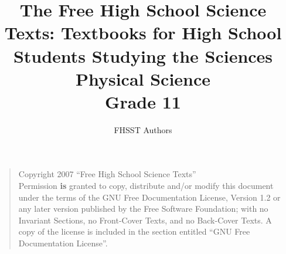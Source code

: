 \documentclass[9pt,a4paper,titlepage,twoside,openright]{extbook}
\begin{document}
\title{The Free High School Science Texts: Textbooks for High School Students Studying the Sciences\\
\textbf{Physical Science}\\
Grade 11}
\author{FHSST Authors}
\maketitle
\begin{quote}
Copyright 2007 ``Free High School Science Texts''\\
Permission \textbf{is} granted to copy, distribute and/or modify this document under the terms of the GNU Free Documentation License, Version 1.2 or any later version published by the Free Software Foundation; with no Invariant Sections, no Front-Cover Texts, and no Back-Cover Texts.
A copy of the license is included in the section entitled ``GNU Free Documentation License''.
\end{quote}
\end{document}
